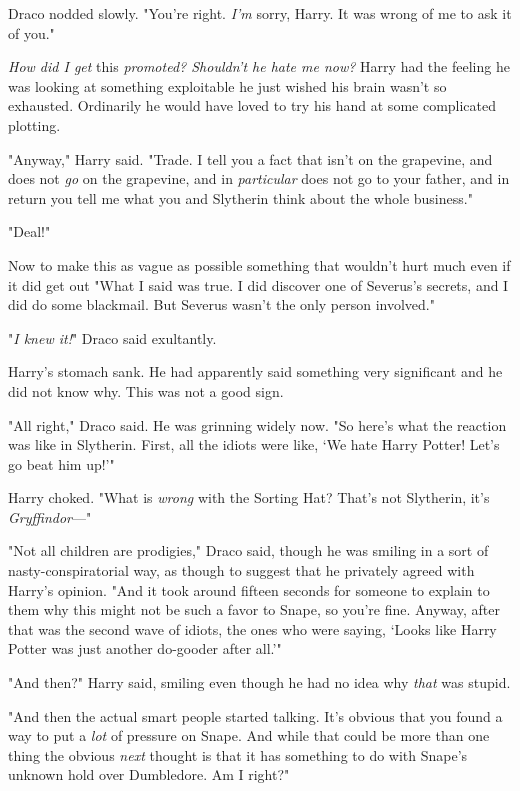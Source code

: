 Draco nodded slowly. "You're right. \emph{I'm} sorry, Harry. It was wrong of me
to ask it of you."

\emph{How did I get} this \emph{promoted? Shouldn't he hate me now?} Harry had
the feeling he was looking at something exploitable{\el} he just wished his
brain wasn't so exhausted. Ordinarily he would have loved to try his hand at
some complicated plotting.

"Anyway," Harry said. "Trade. I tell you a fact that isn't on the grapevine,
and does not \emph{go} on the grapevine, and in \emph{particular} does not go
to your father, and in return you tell me what you and Slytherin think about
the whole business."

"Deal!"

Now to make this as vague as possible{\el} something that wouldn't hurt much
even if it did get out{\el} "What I said was true. I did discover one of
Severus's secrets, and I did do some blackmail. But Severus wasn't the only
person involved."

"\emph{I knew it!}" Draco said exultantly.

Harry's stomach sank. He had apparently said something very significant and he
did not know why. This was not a good sign.

"All right," Draco said. He was grinning widely now. "So here's what the
reaction was like in Slytherin. First, all the idiots were like, `We hate Harry
Potter! Let's go beat him up!'"

Harry choked. "What is \emph{wrong} with the Sorting Hat? That's not Slytherin,
it's \emph{Gryffindor}\mbox{---}"

"Not all children are prodigies," Draco said, though he was smiling in a sort
of nasty-conspiratorial way, as though to suggest that he privately agreed with
Harry's opinion. "And it took around fifteen seconds for someone to explain to
them why this might not be such a favor to Snape, so you're fine. Anyway, after
that was the second wave of idiots, the ones who were saying, `Looks like Harry
Potter was just another do-gooder after all.'"

"And then?" Harry said, smiling even though he had no idea why \emph{that} was
stupid.

"And then the actual smart people started talking. It's obvious that you found
a way to put a \emph{lot} of pressure on Snape. And while that could be more
than one thing{\el} the obvious \emph{next} thought is that it has something
to do with Snape's unknown hold over Dumbledore. Am I right?"

